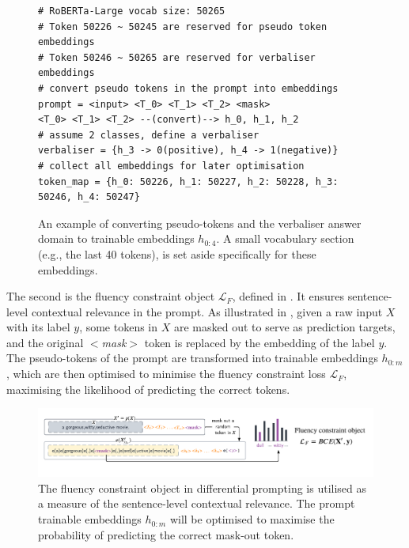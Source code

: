 \begin{figure}[!ht]
\centering
\begin{verbatim}
# RoBERTa-Large vocab size: 50265
# Token 50226 ~ 50245 are reserved for pseudo token embeddings
# Token 50246 ~ 50265 are reserved for verbaliser embeddings 
# convert pseudo tokens in the prompt into embeddings
prompt = <input> <T_0> <T_1> <T_2> <mask>
<T_0> <T_1> <T_2> --(convert)--> h_0, h_1, h_2
# assume 2 classes, define a verbaliser
verbaliser = {h_3 -> 0(positive), h_4 -> 1(negative)}
# collect all embeddings for later optimisation
token_map = {h_0: 50226, h_1: 50227, h_2: 50228, h_3: 50246, h_4: 50247}
\end{verbatim}
\caption{An example of converting pseudo-tokens and the verbaliser answer domain to trainable embeddings $h_{0:4}$. A small vocabulary section (e.g., the last 40 tokens),  is set aside specifically for these embeddings.}
\label{code:diff-1}
\end{figure}

The second is the fluency constraint object $\mathcal{L}_F$, defined in . It ensures sentence-level contextual relevance in the prompt. As illustrated in , given a raw input $X$ with its label $y$, some tokens in $X$ are masked out to serve as prediction targets, and the original $<$\textit{mask}$>$ token is replaced by the embedding of the label $y$. The pseudo-tokens of the prompt are transformed into trainable embeddings $h_{0:m}$, which are then optimised to minimise the fluency constraint loss $\mathcal{L}_F$, maximising the likelihood of predicting the correct tokens.

\begin{figure}[!ht]
    \centering
    \includegraphics[width=\hsize]{figures/implementation_media/impl-diff-fc.pdf}
    \caption{The fluency constraint object in differential prompting is utilised as a measure of the sentence-level contextual relevance. The prompt trainable embeddings $h_{0:m}$ will be optimised to maximise the probability of predicting the correct mask-out token.}
    \label{fig:impl-diff-2}
\end{figure}

